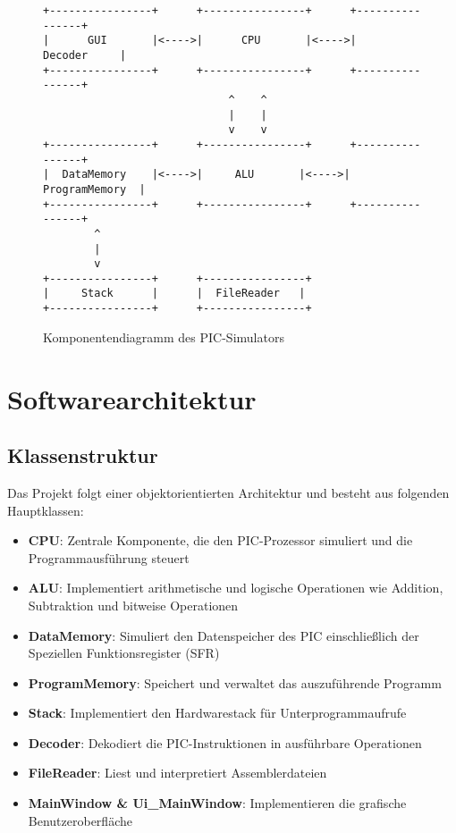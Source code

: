 \documentclass[a4paper,11pt]{report}
\begin{document}
\begin{figure}[h]
\centering
\begin{verbatim}
+----------------+      +----------------+      +----------------+
|      GUI       |<---->|      CPU       |<---->|    Decoder     |
+----------------+      +----------------+      +----------------+
                             ^    ^
                             |    |
                             v    v
+----------------+      +----------------+      +----------------+
|  DataMemory    |<---->|     ALU       |<---->| ProgramMemory  |
+----------------+      +----------------+      +----------------+
        ^
        |
        v
+----------------+      +----------------+
|     Stack      |      |  FileReader   |
+----------------+      +----------------+
\end{verbatim}
\caption{Komponentendiagramm des PIC-Simulators}
\end{figure}

\chapter{Softwarearchitektur}

\section{Klassenstruktur}
Das Projekt folgt einer objektorientierten Architektur und besteht aus folgenden Hauptklassen:

\begin{itemize}
    \item \textbf{CPU}: Zentrale Komponente, die den PIC-Prozessor simuliert und die Programmausführung steuert
    \item \textbf{ALU}: Implementiert arithmetische und logische Operationen wie Addition, Subtraktion und bitweise Operationen
    \item \textbf{DataMemory}: Simuliert den Datenspeicher des PIC einschließlich der Speziellen Funktionsregister (SFR)
    \item \textbf{ProgramMemory}: Speichert und verwaltet das auszuführende Programm
    \item \textbf{Stack}: Implementiert den Hardwarestack für Unterprogrammaufrufe
    \item \textbf{Decoder}: Dekodiert die PIC-Instruktionen in ausführbare Operationen
    \item \textbf{FileReader}: Liest und interpretiert Assemblerdateien
    \item \textbf{MainWindow \& Ui\_MainWindow}: Implementieren die grafische Benutzeroberfläche
\end{itemize}
\end{document}
